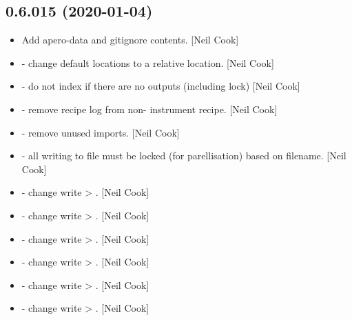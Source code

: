 \documentclass[a4paper,10pt,english]{report}
\begin{document}
\subsection{0.6.015 (2020-01-04)}
\label{\detokenize{misc/changelog:id4}}\begin{itemize}
\item {} 
Add apero-data and gitignore contents. {[}Neil Cook{]}

\item {} 
 - change default locations
to a relative location. {[}Neil Cook{]}

\item {} 
 - do not index if there are no outputs
(including lock) {[}Neil Cook{]}

\item {} 
 - remove recipe log from non-
instrument recipe. {[}Neil Cook{]}

\item {} 
 - remove unused imports. {[}Neil Cook{]}

\item {} 
 - all writing to file must be locked (for
parellisation) based on filename. {[}Neil Cook{]}

\item {} 
 - change write \textendash{}\textgreater{} . {[}Neil Cook{]}

\item {} 
 - change write \textendash{}\textgreater{} . {[}Neil Cook{]}

\item {} 
 - change write \textendash{}\textgreater{} . {[}Neil Cook{]}

\item {} 
 - change write \textendash{}\textgreater{} . {[}Neil Cook{]}

\item {} 
 - change write \textendash{}\textgreater{} . {[}Neil Cook{]}

\item {} 
 - change write \textendash{}\textgreater{} . {[}Neil
Cook{]}


\end{itemize}
\end{document}
